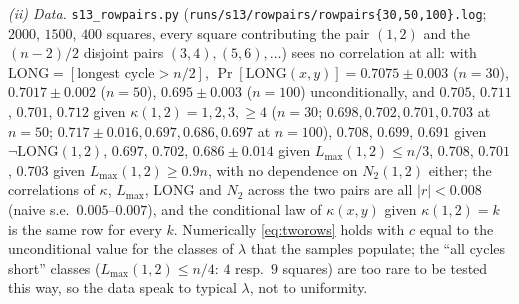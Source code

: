 \emph{(ii) Data.}  \texttt{s13\_rowpairs.py}
(\texttt{runs/s13/rowpairs/rowpairs\{30,50,100\}.log}; $2000$, $1500$,
$400$ squares, every square contributing the pair $(1,2)$ and the
$(n-2)/2$ disjoint pairs $(3,4),(5,6),\dots$) sees no correlation at
all: with $\mathrm{LONG}=[\text{longest cycle}>n/2]$,
$\Pr[\mathrm{LONG}(x,y)]=0.7075\pm0.003$ ($n=30$), $0.7017\pm0.002$
($n=50$), $0.695\pm0.003$ ($n=100$) unconditionally, and $0.705$,
$0.711$, $0.701$, $0.712$ given $\kappa(1,2)=1,2,3,\ge4$ ($n=30$;
$0.698,0.702,0.701,0.703$ at $n=50$; $0.717\pm0.016,0.697,0.686,0.697$
at $n=100$), $0.708$, $0.699$, $0.691$ given $\neg\mathrm{LONG}(1,2)$,
$0.697$, $0.702$, $0.686\pm0.014$ given $L_{\max}(1,2)\le n/3$,
$0.708$, $0.701$, $0.703$ given $L_{\max}(1,2)\ge0.9n$, with no
dependence on $N_2(1,2)$ either; the correlations of $\kappa$,
$L_{\max}$, $\mathrm{LONG}$ and $N_2$ across the two pairs are all
$|r|<0.008$ (naive s.e.\ $0.005$--$0.007$), and
the conditional law of $\kappa(x,y)$ given $\kappa(1,2)=k$ is the same
row for every $k$.  Numerically \eqref{eq:tworows} holds with $c$ equal
to the unconditional value for the classes of $\lambda$ that the
samples populate; the ``all cycles short'' classes
($L_{\max}(1,2)\le n/4$: $4$ resp.\ $9$ squares) are too rare to be
tested this way, so the data speak to typical $\lambda$, not to
uniformity.

